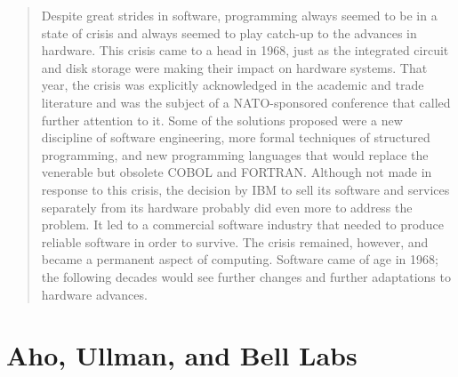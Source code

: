 \begin{quotation}
Despite great strides in software, programming always seemed to be in a state 
of crisis and always seemed to play catch-up to the advances in hardware. This 
crisis came to a head in 1968, just as the integrated circuit and disk storage 
were making their impact on hardware systems. That year, the crisis was 
explicitly acknowledged in the academic and trade literature and was the 
subject of a NATO-sponsored conference that called further attention to it. 
Some of the solutions proposed were a new discipline of software engineering, 
more formal techniques of structured programming, and new programming languages 
that would replace the venerable but obsolete COBOL and FORTRAN. Although not 
made in response to this crisis, the decision by IBM to sell its software and 
services separately from its hardware probably did even more to address the 
problem. It led to a commercial software industry that needed to produce 
reliable software in order to survive. The crisis remained, however, and became 
a permanent aspect of computing. Software came of age in 1968; the following 
decades would see further changes and further adaptations to hardware advances.
\end{quotation}


\section{Aho, Ullman, and Bell Labs}


